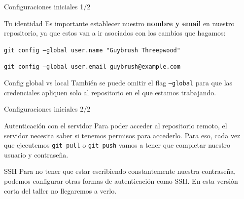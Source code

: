 \begin{frame}[fragile]{Configuraciones iniciales 1/2}

    \begin{block}{Tu identidad}
        Es importante establecer nuestro \textbf{nombre y email} en nuestro repositorio, ya que estos van a ir asociados con los cambios que hagamos:

        \vspace{0.5em}

        \texttt{git config --global user.name "Guybrush Threepwood"}

        \texttt{git config --global user.email guybrush@example.com}
    \end{block}

    \begin{block}{Config global vs local}
    También se puede omitir el flag \texttt{--global} para que las credenciales apliquen solo al repositorio en el que estamos trabajando.
    \end{block}

\end{frame}
\begin{frame}[fragile]{Configuraciones iniciales 2/2}

	\begin{block}{Autenticación con el servidor}
        Para poder acceder al repositorio remoto, el servidor necesita saber si tenemos permisos para accederlo. Para eso, cada vez que ejecutemos \texttt{git pull} o \texttt{git push} vamos a tener que completar nuestro usuario y contraseña.

	\end{block}

	\begin{block}{SSH}
        Para no tener que estar escribiendo constantemente nuestra contraseña, podemos configurar otras formas de autenticación como SSH. En esta versión corta del taller no llegaremos a verlo.

	\end{block}
\end{frame}
